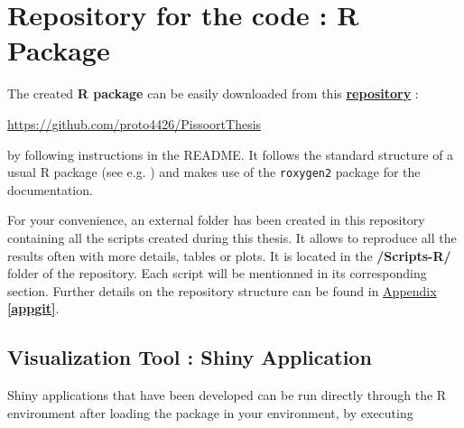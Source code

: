\section*{Repository for the code : R Package}

The created \textbf{R package} can be easily downloaded from this \href{https://github.com/proto4426/PissoortThesis}{\textbf{repository}} :
\begin{center}\label{xxx}
 \url{https://github.com/proto4426/PissoortThesis}
\end{center}
by following instructions in the README. It follows the standard structure of a usual R package (see e.g. \citet{leisch_creating_2008}) and makes use of the \texttt{roxygen2} package for the documentation.

For your convenience, an external folder has been created in this repository containing all the scripts created during this thesis. It allows to reproduce all the results often with more details, tables or plots. It is located in the \textbf{/Scripts-R/} folder of the repository. Each script will be mentionned in its corresponding section. Further details on the repository structure can be found in \hyperref[appgit]{Appendix \textbf{\ref{appgit}}}.

\subsection*{Visualization Tool : Shiny Application}

Shiny applications that have been developed can be run directly through the R environment after loading the package in your environment, by executing 

